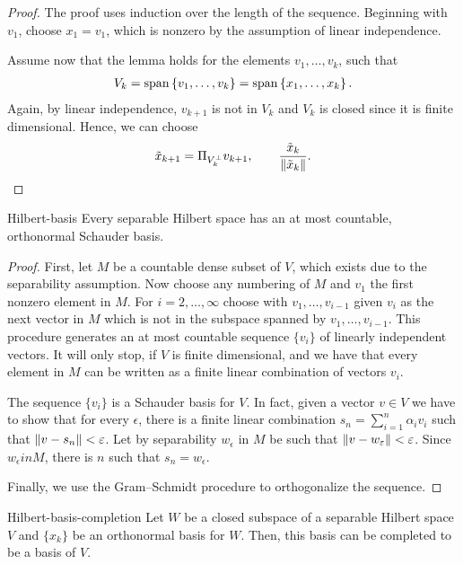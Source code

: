 \begin{proof}
  The proof uses induction over the length of the sequence.  Beginning
  with $v_1$, choose $x_1 = v_1$, which is nonzero by the assumption
  of linear independence.

  Assume now that the lemma holds for the elements $v_1,\dots,v_k$, such that
  \begin{gather*}
    V_k = \operatorname{span}\left\{v_1,\dots,v_k\right\} = \operatorname{span}\left\{x_1,\dots,x_k\right\}.
  \end{gather*}
  Again, by linear independence, $v_{k+1}$ is not in $V_k$ and $V_k$
  is closed since it is finite dimensional. Hence, we can choose
  \begin{gather*}
    \tilde x_{k+1} = \Pi_{V^\perp_k} v_{k+1},
    \qquad \frac{\tilde x_k}{\lVert\tilde x_k\rVert}.
  \end{gather*}
\end{proof}

  
\begin{Theorem}{Hilbert-basis}
  Every separable Hilbert space has an at most countable, orthonormal
  Schauder basis.
\end{Theorem}

\begin{proof}
  First, let $M$ be a countable dense subset
  of $V$, which exists due to the separability assumption. Now choose
  any numbering of $M$ and $v_1$ the first nonzero element in
  $M$. For $i=2,\dots,\infty$ choose with $v_1,\dots,v_{i-1}$ given
  $v_i$ as the next vector in $M$ which is not in the subspace spanned
  by $v_1,\dots,v_{i-1}$. This procedure generates an at most
  countable sequence $\{v_i\}$ of linearly independent vectors. It
  will only stop, if $V$ is finite dimensional, and we have that every
  element in $M$ can be written as a finite linear combination of
  vectors $v_i$.
  
  The sequence $\{v_i\}$ is a Schauder basis for $V$. In fact, given a
  vector $v\in V$ we have to show that for every $\epsilon$, there is
  a finite linear combination $s_n = \sum_{i=1}^n \alpha_i v_i$ such
  that $\lVert v-s_n\rVert < \varepsilon$. Let by separability $w_\epsilon$ in
  $M$ be such that $\lVert v-w_\varepsilon\rVert < \varepsilon$. Since
  $w_\epsilon in M$, there is $n$ such that $s_n = w_\epsilon$.

  Finally, we use the Gram--Schmidt procedure to orthogonalize the
  sequence.
\end{proof}

\begin{Theorem}{Hilbert-basis-completion}
  Let $W$ be a closed subspace of a separable Hilbert space $V$ and
  $\{x_k\}$ be an orthonormal basis for $W$. Then, this basis can be
completed to be a basis of $V$.
\end{Theorem}

